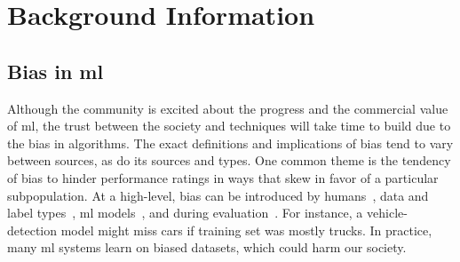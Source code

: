\section{Background Information}
\subsection{Bias in \gls{ml}}
Although the community is excited about the progress and the commercial value of \gls{ml}, the trust between the society and techniques will take time to build due to the bias in algorithms. The exact definitions and implications of bias tend to vary between sources, as do its sources and types. One common theme is the tendency of bias to hinder performance ratings in ways that skew in favor of a particular subpopulation. At a high-level, bias can be introduced by humans~\cite{windmann1998subconscious}, data and label types~\cite{tommasi2017deeper}, \gls{ml} models~\cite{amini2019uncovering, kim2019learning}, and during evaluation~\cite{stock2018convnets}. For instance, a vehicle-detection model might miss cars if training set was mostly trucks. In practice, many \gls{ml} systems learn on biased datasets, which could harm our society. 


